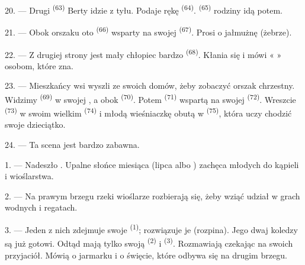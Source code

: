 20. --- Drugi  \textsuperscript{(63)} Berty idzie z tyłu. Podaje rękę
 \textsuperscript{(64)}.  \textsuperscript{(65)}
rodziny idą potem.

\VUsaut{4.6mm}
\VUsaut{3.4mm}

21. --- Obok orszaku oto  \textsuperscript{(66)} wsparty na swojej
 \textsuperscript{(67)}. Prosi o jałmużnę (żebrze).

22. --- Z drugiej strony jest mały chłopiec bardzo 
\textsuperscript{(68)}. Kłania się i mówi «  » osobom, które zna.

23. --- Mieszkańcy wsi wyszli ze swoich domów, żeby zobaczyć orszak chrzestny. Widzimy
 \textsuperscript{(69)} w swojej , a obok
 \textsuperscript{(70)}. Potem 
\textsuperscript{(71)} wspartą na swojej  \textsuperscript{(72)}. Wreszcie
 \textsuperscript{(73)} w swoim wielkim 
\textsuperscript{(74)} i młodą wieśniaczkę obutą w 
\textsuperscript{(75)}, która uczy chodzić swoje dzieciątko.

24. --- Ta scena jest bardzo zabawna.
\VUsaut{4.0mm}

\VUsaut{3.0mm}

\VUsaut{2.4mm}

\VUsaut{3.0mm}

1. --- Nadeszło . Upalne słońce miesiąca  (lipca albo
) zachęca młodych do kąpieli i wioślarstwa.

2. --- Na prawym brzegu rzeki wioślarze rozbierają się, żeby wziąć udział w grach
wodnych i regatach.

3. --- Jeden z nich zdejmuje swoje  \textsuperscript{(1)}; rozwiązuje je
(rozpina). Jego dwaj koledzy są już gotowi. Odtąd mają tylko swoją  \textsuperscript{(2)} i  \textsuperscript{(3)}. Rozmawiają
czekając na swoich przyjaciół. Mówią o jarmarku i o święcie, które odbywa się na drugim
brzegu.

